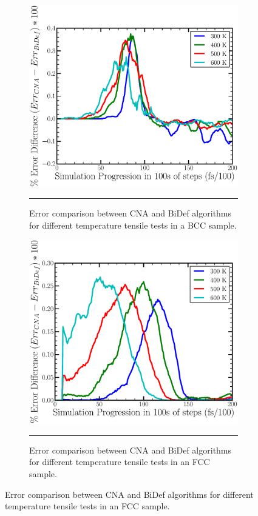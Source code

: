 \documentclass[12pt]{iopart}
\begin{document}
\begin{figure}[htbp]
\begin{figure}[htbp]
  \centering
    \includegraphics[scale=0.50]{Figures/bcc_error.eps}
    \rule{35em}{0.5pt}
  \caption[]{Error comparison between CNA and BiDef algorithms for different temperature tensile tests in a BCC sample.}
  \label{fig:errorbcc}
\end{figure}

\begin{figure}[htbp]
  \centering
    \includegraphics[scale=0.50]{Figures/fcc_error.eps}
    \rule{35em}{0.5pt}
  \caption[]{Error comparison between CNA and BiDef algorithms for different temperature tensile tests in an FCC sample.}
  \label{fig:errorfcc}
\end{figure}


\end{figure}
\end{document}
